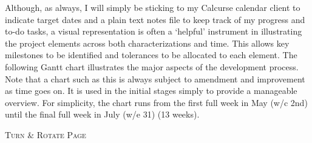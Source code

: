 \documentclass[11pt, english]{article}
\begin{document}
	Although, as always, I will simply be sticking to my Calcurse calendar client to indicate target dates and a plain text notes file to keep track of my progress and to-do tasks, a visual representation is often a `helpful' instrument in illustrating the project elements across both characterizations and time. This allows key milestones to be identified and tolerances to be allocated to each element. The following Gantt chart illustrates the major aspects of the development process. Note that a chart such as this is always subject to amendment and improvement as time goes on. It is used in the initial stages simply to provide a manageable overview. For simplicity, the chart runs from the first full week in May (w/c 2nd) until the final full week in July (w/e 31) (13 weeks).

	\vspace{\fill}

	\begin{center}
		\textsc{Turn \& Rotate Page}
	\end{center}

\newpage
\end{document}
